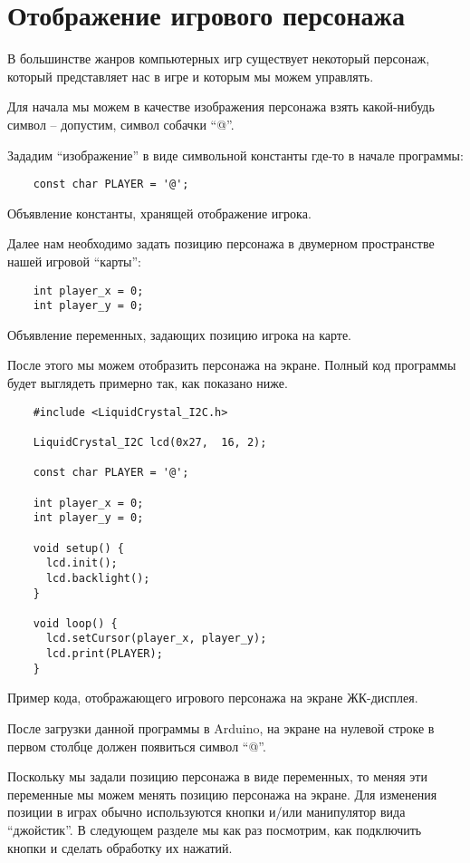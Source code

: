 \documentclass[../sparc.tex]{subfiles}
\begin{document}
\section{Отображение игрового персонажа}
\label{section:player}

В большинстве жанров компьютерных игр существует некоторый персонаж, который
представляет нас в игре и которым мы можем управлять.

Для начала мы можем в качестве изображения персонажа взять какой-нибудь символ
-- допустим, символ собачки ``@''.

Зададим ``изображение'' в виде символьной константы где-то в начале программы:

\begin{listing}[ht]
  \begin{verbatim}
    const char PLAYER = '@';
  \end{verbatim}
  \caption{Объявление константы, хранящей отображение игрока.}
  \label{listing:game-dev-player-image}
\end{listing}

Далее нам необходимо задать позицию персонажа в двумерном пространстве нашей
игровой ``карты'':

\begin{listing}[ht]
  \begin{verbatim}
    int player_x = 0;
    int player_y = 0;
  \end{verbatim}
  \caption{Объявление переменных, задающих позицию игрока на карте.}
  \label{listing:game-dev-player-position}
\end{listing}

После этого мы можем отобразить персонажа на экране.  Полный код программы будет
выглядеть примерно так, как показано ниже.

\begin{listing}[ht]
  \begin{verbatim}
    #include <LiquidCrystal_I2C.h>

    LiquidCrystal_I2C lcd(0x27,  16, 2);

    const char PLAYER = '@';

    int player_x = 0;
    int player_y = 0;

    void setup() {
      lcd.init();
      lcd.backlight();
    }

    void loop() {
      lcd.setCursor(player_x, player_y);
      lcd.print(PLAYER);
    }
  \end{verbatim}
  \caption{Пример кода, отображающего игрового персонажа на экране ЖК-дисплея.}
  \label{listing:game-dev-player-example}
\end{listing}

После загрузки данной программы в Arduino, на экране на нулевой строке в первом
столбце должен появиться символ ``@''.

Поскольку мы задали позицию персонажа в виде переменных, то меняя эти переменные
мы можем менять позицию персонажа на экране.  Для изменения позиции в играх
обычно используются кнопки и/или манипулятор вида ``джойстик''.  В следующем
разделе мы как раз посмотрим, как подключить кнопки и сделать обработку их
нажатий.
\end{document}
